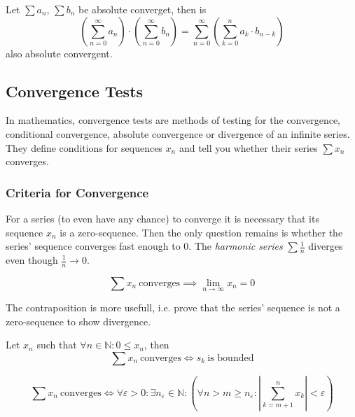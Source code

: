 \begin{theorem}
   Let \(\sum a_n\), \(\sum b_n\) be absolute converget, then is
   \[\left(\sum_{n=0}^\infty a_n\right) \cdot \left(\sum_{n=0}^\infty b_n\right) = \sum_{n=0}^\infty\left(\sum_{k=0}^n a_k \cdot b_{n - k}\right)\]
   also absolute convergent.
\end{theorem}

\subsection{Convergence Tests}
In mathematics, convergence tests are methods of testing for the convergence, conditional convergence, absolute convergence or divergence of an infinite series.
They define conditions for sequences \(x_n\) and tell you whether their series \(\sum x_n\) converges.

\subsubsection{Criteria for Convergence}
For a series (to even have any chance) to converge it is necessary that its sequence \(x_n\) is a zero-sequence.
Then the only question remains is whether the series' sequence converges fast enough to 0.
The \emph{harmonic series} \(\sum \frac{1}{n}\) diverges even though \(\frac{1}{n} \to 0\).
\begin{proposition}\label{pro:series_sequence_converge}
   \[\sum x_n~\text{converges} \implies \lim_{n \to \infty} x_n = 0\]
\end{proposition}
\begin{remark}[Tips]
   The contraposition is more usefull, i.e. prove that the series' sequence is not a zero-sequence to show divergence.
\end{remark}

\begin{theorem}\label{thm:convergence=bounded}
   Let \(x_n\) such that \(\forall n \in \mathbb{N}: 0 \leq x_n\), then
   \[\sum x_n~\text{converges} \iff s_k~\text{is bounded}\]
\end{theorem}

\begin{theorem}\label{thm:cauchy_crit_ser}
   \[\sum x_n~\text{converges} \iff \forall \varepsilon > 0: \exists n_\varepsilon \in \mathbb{N}: \left(\forall n > m \geq n_\varepsilon: \left| \sum_{k = m + 1}^n x_k \right| < \varepsilon \right)\]
\end{theorem}

